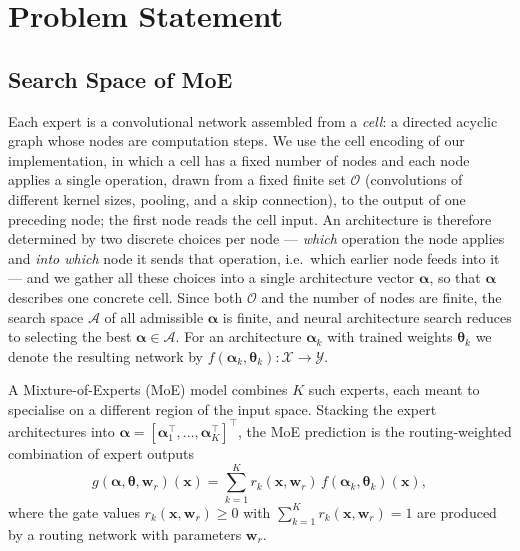 \section{Problem Statement}
\label{sec:problem_statement}

\subsection{Search Space of MoE}
\label{subsec:searchspace}

Each expert is a convolutional network assembled from a \emph{cell}: a
directed acyclic graph whose nodes are computation steps. We use the
cell encoding of our implementation, in which a cell has a fixed number
of nodes and each node applies a single operation, drawn from a fixed
finite set $\mathcal{O}$ (convolutions of different kernel sizes,
pooling, and a skip connection), to the output of one preceding node;
the first node reads the cell input. An architecture is therefore
determined by two discrete choices per node --- \emph{which} operation
the node applies and \emph{into which} node it sends that operation,
i.e.\ which earlier node feeds into it --- and we gather all these
choices into a single architecture vector $\boldsymbol{\alpha}$, so that
$\boldsymbol{\alpha}$ describes one concrete cell. Since both
$\mathcal{O}$ and the number of nodes are finite, the search space
$\mathcal{A}$ of all admissible $\boldsymbol{\alpha}$ is finite, and
neural architecture search reduces to selecting the best
$\boldsymbol{\alpha} \in \mathcal{A}$. For an architecture
$\boldsymbol{\alpha}_k$ with trained weights $\boldsymbol{\theta}_k$ we
denote the resulting network by
$f(\boldsymbol{\alpha}_k, \boldsymbol{\theta}_k): \mathcal{X} \to \mathcal{Y}$.

A Mixture-of-Experts (MoE) model combines $K$ such experts, each meant
to specialise on a different region of the input space. Stacking the
expert architectures into
$\boldsymbol{\alpha} = [\boldsymbol{\alpha}_1^{\!\top}, \ldots, \boldsymbol{\alpha}_K^{\!\top}]^{\!\top}$,
the MoE prediction is the routing-weighted combination of expert outputs
\begin{equation}
\label{eq:moe_pred}
g(\boldsymbol{\alpha}, \boldsymbol{\theta}, \boldsymbol{w}_r)(\boldsymbol{x})
= \sum_{k=1}^{K} r_k(\boldsymbol{x}, \boldsymbol{w}_r)\, f(\boldsymbol{\alpha}_k, \boldsymbol{\theta}_k)(\boldsymbol{x}),
\end{equation}
where the gate values $r_k(\boldsymbol{x}, \boldsymbol{w}_r) \geq 0$ with
$\sum_{k=1}^{K} r_k(\boldsymbol{x}, \boldsymbol{w}_r) = 1$ are produced by
a routing network with parameters $\boldsymbol{w}_r$.

